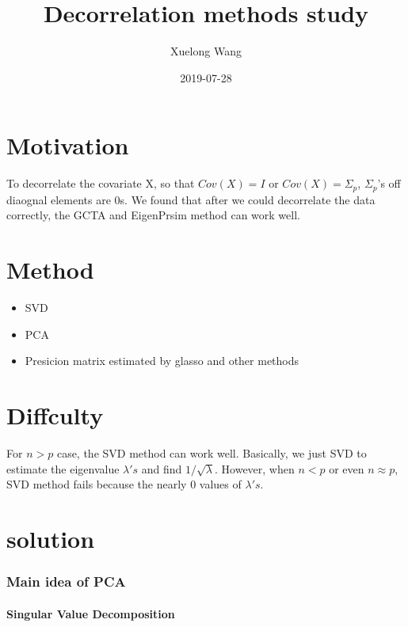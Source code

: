 \documentclass[]{article}
\title{Decorrelation methods study}
\author{Xuelong Wang}
\date{2019-07-28}
\providecommand{\tightlist}{%
  \setlength{\itemsep}{0pt}\setlength{\parskip}{0pt}}
\let\oldparagraph\paragraph
\renewcommand{\paragraph}[1]{\oldparagraph{#1}\mbox{}}
\begin{document}
\maketitle

\section{Motivation}\label{motivation}

To decorrelate the covariate X, so that \(Cov(X) = I\) or
\(Cov(X) = \Sigma_p\), \(\Sigma_p\)'s off diaognal elements are 0s. We
found that after we could decorrelate the data correctly, the GCTA and
EigenPrsim method can work well.

\section{Method}\label{method}

\begin{itemize}
\tightlist
\item
  SVD\\
\item
  PCA\\
\item
  Presicion matrix estimated by glasso and other methods
\end{itemize}

\section{Diffculty}\label{diffculty}

For \(n >p\) case, the SVD method can work well. Basically, we just SVD
to estimate the eigenvalue \(\lambda's\) and find \(1/\sqrt{\lambda}\).
However, when \(n <p\) or even \(n \approx p\), SVD method fails because
the nearly 0 values of \(\lambda's\).

\section{solution}\label{solution}

\subsubsection{Main idea of PCA}\label{main-idea-of-pca}

\paragraph{Singular Value
Decomposition}\label{singular-value-decomposition}
\end{document}
